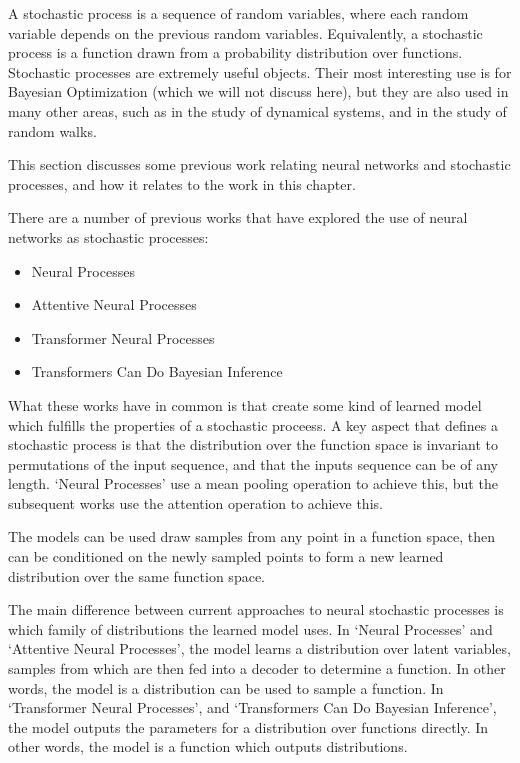 A stochastic process is a sequence of random variables, where each random variable depends on the previous random variables. Equivalently, a stochastic process is a function drawn from a probability distribution over functions. Stochastic processes are extremely useful objects. Their most interesting use is for Bayesian Optimization (which we will not discuss here), but they are also used in many other areas, such as in the study of dynamical systems, and in the study of random walks.

This section discusses some previous work relating neural networks and stochastic processes, and how it relates to the work in this chapter.

There are a number of previous works that have explored the use of neural networks as stochastic processes:
\begin{itemize}
    \item Neural Processes \cite{neural-processes}
    \item Attentive Neural Processes \cite{attentive-neural-processes}
    \item Transformer Neural Processes \cite{transformer-neural-processes}
    \item Transformers Can Do Bayesian Inference \cite{transformers-bayesian}
\end{itemize}

What these works have in common is that create some kind of learned model which fulfills the properties of a stochastic proceess. A key aspect that defines a stochastic process is that the distribution over the function space is invariant to permutations of the input sequence, and that the inputs sequence can be of any length. `Neural Processes' use a mean pooling operation to achieve this, but the subsequent works use the attention operation to achieve this.

The models can be used draw samples from any point in a function space, then can be conditioned on the newly sampled points to form a new learned distribution over the same function space.

The main difference between current approaches to neural stochastic processes is which family of distributions the learned model uses. In `Neural Processes' and `Attentive Neural Processes', the model learns a distribution over latent variables, samples from which are then fed into a decoder to determine a function. In other words, the model is a distribution can be used to sample a function. In `Transformer Neural Processes', and `Transformers Can Do Bayesian Inference', the model outputs the parameters for a distribution over functions directly. In other words, the model is a function which outputs distributions.


